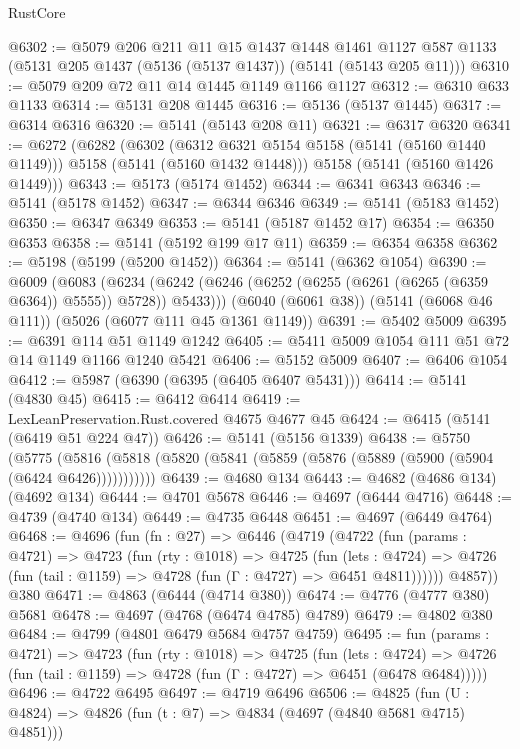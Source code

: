 \begin{lexlean}{RustCore}
\begin{coremodule}
@6302 := @5079
    @206
    @211
    @11
    @15
    @1437
    @1448
    @1461
    @1127
    @587
    @1133
    (@5131 @205 @1437 (@5136 (@5137 @1437)) (@5141 (@5143 @205 @11)))
@6310 := @5079 @209 @72 @11 @14 @1445 @1149 @1166 @1127
@6312 := @6310 @633 @1133
@6314 := @5131 @208 @1445
@6316 := @5136 (@5137 @1445)
@6317 := @6314 @6316
@6320 := @5141 (@5143 @208 @11)
@6321 := @6317 @6320
@6341 := @6272
    (@6282
      (@6302
        (@6312 @6321 @5154 @5158 (@5141 (@5160 @1440 @1149)))
        @5158
        (@5141 (@5160 @1432 @1448)))
      @5158
      (@5141 (@5160 @1426 @1449)))
@6343 := @5173 (@5174 @1452)
@6344 := @6341 @6343
@6346 := @5141 (@5178 @1452)
@6347 := @6344 @6346
@6349 := @5141 (@5183 @1452)
@6350 := @6347 @6349
@6353 := @5141 (@5187 @1452 @17)
@6354 := @6350 @6353
@6358 := @5141 (@5192 @199 @17 @11)
@6359 := @6354 @6358
@6362 := @5198 (@5199 (@5200 @1452))
@6364 := @5141 (@6362 @1054)
@6390 := @6009
    (@6083 (@6234 (@6242 (@6246 (@6252 (@6255 (@6261 (@6265 (@6359 @6364)) @5555)) @5728)) @5433)))
    (@6040 (@6061 @38))
    (@5141 (@6068 @46 @111))
    (@5026 (@6077 @111 @45 @1361 @1149))
@6391 := @5402 @5009
@6395 := @6391 @114 @51 @1149 @1242
@6405 := @5411 @5009 @1054 @111 @51 @72 @14 @1149 @1166 @1240 @5421
@6406 := @5152 @5009
@6407 := @6406 @1054
@6412 := @5987 (@6390 (@6395 (@6405 @6407 @5431)))
@6414 := @5141 (@4830 @45)
@6415 := @6412 @6414
@6419 := LexLeanPreservation.Rust.covered @4675 @4677 @45
@6424 := @6415 (@5141 (@6419 @51 @224 @47))
@6426 := @5141 (@5156 @1339)
@6438 := @5750
    (@5775 (@5816 (@5818 (@5820 (@5841 (@5859 (@5876 (@5889 (@5900 (@5904 (@6424 @6426)))))))))))
@6439 := @4680 @134
@6443 := @4682 (@4686 @134) (@4692 @134)
@6444 := @4701 @5678
@6446 := @4697 (@6444 @4716)
@6448 := @4739 (@4740 @134)
@6449 := @4735 @6448
@6451 := @4697 (@6449 @4764)
@6468 := @4696
    (fun (fn : @27) =>
    @6446
      (@4719
        (@4722
          (fun (params : @4721) =>
          @4723
            (fun (rty : @1018) =>
            @4725
              (fun (lets : @4724) =>
              @4726 (fun (tail : @1159) => @4728 (fun (Γ : @4727) => @6451 @4811))))))
        @4857))
    @380
@6471 := @4863 (@6444 (@4714 @380))
@6474 := @4776 (@4777 @380) @5681
@6478 := @4697 (@4768 (@6474 @4785) @4789)
@6479 := @4802 @380
@6484 := @4799 (@4801 @6479 @5684 @4757 @4759)
@6495 := fun (params : @4721) =>
  @4723
    (fun (rty : @1018) =>
    @4725
      (fun (lets : @4724) =>
      @4726 (fun (tail : @1159) => @4728 (fun (Γ : @4727) => @6451 (@6478 @6484)))))
@6496 := @4722 @6495
@6497 := @4719 @6496
@6506 := @4825 (fun (U : @4824) => @4826 (fun (t : @7) => @4834 (@4697 (@4840 @5681 @4715) @4851)))

\end{coremodule}
\end{lexlean}
